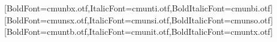 \usepackage{fontspec}
\setmainfont{cmunrm.otf}[BoldFont=cmunbx.otf,ItalicFont=cmunti.otf,BoldItalicFont=cmunbi.otf]
\setsansfont{cmunss.otf}[BoldFont=cmunsx.otf,ItalicFont=cmunsi.otf,BoldItalicFont=cmunso.otf]
\setmonofont{cmuntt.otf}[BoldFont=cmuntb.otf,ItalicFont=cmunit.otf,BoldItalicFont=cmuntx.otf]
